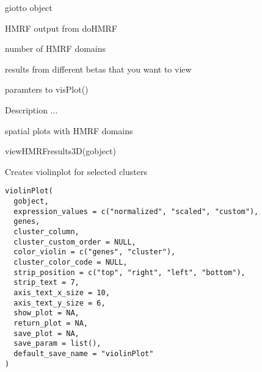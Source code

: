 \documentclass[a4paper]{book}
\begin{document}
\begin{Arguments}
\begin{ldescription}
\item[\code{gobject}] giotto object

\item[\code{HMRFoutput}] HMRF output from doHMRF

\item[\code{k}] number of HMRF domains

\item[\code{betas\_to\_view}] results from different betas that you want to view

\item[\code{...}] paramters to visPlot()
\end{ldescription}
\end{Arguments}
%
\begin{Details}\relax
Description ...
\end{Details}
%
\begin{Value}
spatial plots with HMRF domains
\end{Value}
%
\begin{SeeAlso}\relax
{}
\end{SeeAlso}
%
\begin{Examples}
\begin{ExampleCode}
    viewHMRFresults3D(gobject)
\end{ExampleCode}
\end{Examples}
%
\begin{Description}\relax
Creates violinplot for selected clusters
\end{Description}
%
\begin{Usage}
\begin{verbatim}
violinPlot(
  gobject,
  expression_values = c("normalized", "scaled", "custom"),
  genes,
  cluster_column,
  cluster_custom_order = NULL,
  color_violin = c("genes", "cluster"),
  cluster_color_code = NULL,
  strip_position = c("top", "right", "left", "bottom"),
  strip_text = 7,
  axis_text_x_size = 10,
  axis_text_y_size = 6,
  show_plot = NA,
  return_plot = NA,
  save_plot = NA,
  save_param = list(),
  default_save_name = "violinPlot"
)
\end{verbatim}
\end{Usage}
%
\end{document}
